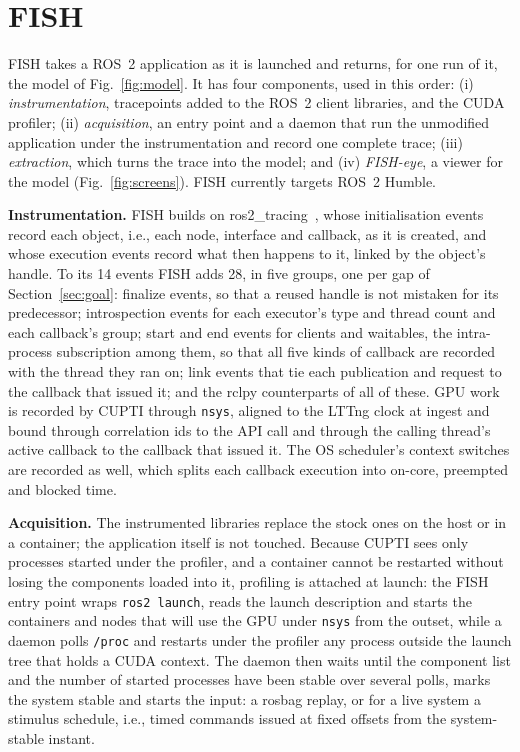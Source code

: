 \section{FISH}
\label{sec:method}
FISH takes a ROS~2 application as it is launched and returns, for one run of it, the model of Fig.~\ref{fig:model}. It has four components, used in this order: (i) \emph{instrumentation}, tracepoints added to the ROS~2 client libraries, and the CUDA profiler; (ii) \emph{acquisition}, an entry point and a daemon that run the unmodified application under the instrumentation and record one complete trace; (iii) \emph{extraction}, which turns the trace into the model; and (iv) \emph{FISH-eye}, a viewer for the model (Fig.~\ref{fig:screens}). FISH currently targets ROS~2 Humble.

\noindent\textbf{Instrumentation.} FISH builds on ros2\_tracing~\cite{bedard-2022-ros2tracing}, whose initialisation events record each object, i.e., each node, interface and callback, as it is created, and whose execution events record what then happens to it, linked by the object's handle. To its 14 events FISH adds 28, in five groups, one per gap of Section~\ref{sec:goal}: finalize events, so that a reused handle is not mistaken for its predecessor; introspection events for each executor's type and thread count and each callback's group; start and end events for clients and waitables, the intra-process subscription among them, so that all five kinds of callback are recorded with the thread they ran on; link events that tie each publication and request to the callback that issued it; and the rclpy counterparts of all of these. GPU work is recorded by CUPTI through \texttt{nsys}, aligned to the LTTng clock at ingest and bound through correlation ids to the API call and through the calling thread's active callback to the callback that issued it. The OS scheduler's context switches are recorded as well, which splits each callback execution into on-core, preempted and blocked time.

\noindent\textbf{Acquisition.} The instrumented libraries replace the stock ones on the host or in a container; the application itself is not touched. Because CUPTI sees only processes started under the profiler, and a container cannot be restarted without losing the components loaded into it, profiling is attached at launch: the FISH entry point wraps \texttt{ros2 launch}, reads the launch description and starts the containers and nodes that will use the GPU under \texttt{nsys} from the outset, while a daemon polls \texttt{/proc} and restarts under the profiler any process outside the launch tree that holds a CUDA context. The daemon then waits until the component list and the number of started processes have been stable over several polls, marks the system stable and starts the input: a rosbag replay, or for a live system a stimulus schedule, i.e., timed commands issued at fixed offsets from the system-stable instant.

